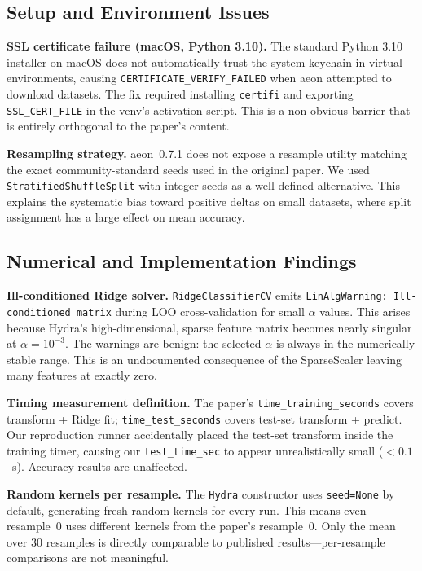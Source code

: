 \documentclass[conference]{IEEEtran}
\begin{document}
\subsection{Setup and Environment Issues}

\textbf{SSL certificate failure (macOS, Python 3.10).} The standard
Python 3.10 installer on macOS does not automatically trust the system
keychain in virtual environments, causing \texttt{CERTIFICATE\_VERIFY\_FAILED}
when aeon attempted to download datasets. The fix required installing
\texttt{certifi} and exporting \texttt{SSL\_CERT\_FILE} in the venv's
activation script. This is a non-obvious barrier that is entirely orthogonal
to the paper's content.

\textbf{Resampling strategy.} aeon~0.7.1 does not expose a resample utility
matching the exact community-standard seeds used in the original paper. We
used \texttt{StratifiedShuffleSplit} with integer seeds as a well-defined
alternative. This explains the systematic bias toward positive deltas on
small datasets, where split assignment has a large effect on mean accuracy.

\subsection{Numerical and Implementation Findings}

\textbf{Ill-conditioned Ridge solver.}
\texttt{RidgeClassifierCV} emits \texttt{LinAlgWarning: Ill-conditioned
matrix} during LOO cross-validation for small $\alpha$ values. This arises
because Hydra's high-dimensional, sparse feature matrix becomes nearly
singular at $\alpha = 10^{-3}$. The warnings are benign: the selected
$\alpha$ is always in the numerically stable range. This is an undocumented
consequence of the SparseScaler leaving many features at exactly zero.

\textbf{Timing measurement definition.}
The paper's \texttt{time\_training\_seconds} covers transform + Ridge fit;
\texttt{time\_test\_seconds} covers test-set transform + predict. Our
reproduction runner accidentally placed the test-set transform inside the
training timer, causing our \texttt{test\_time\_sec} to appear unrealistically
small ($< 0.1$~s). Accuracy results are unaffected.

\textbf{Random kernels per resample.}
The \texttt{Hydra} constructor uses \texttt{seed=None} by default, generating
fresh random kernels for every run. This means even resample~0 uses
different kernels from the paper's resample~0. Only the mean over 30 resamples
is directly comparable to published results---per-resample comparisons
are not meaningful.
\end{document}
